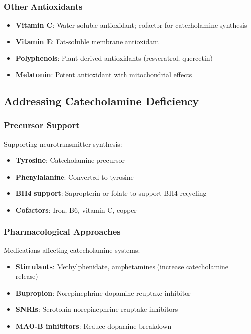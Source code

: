 \subsubsection{Other Antioxidants}

\begin{itemize}
    \item \textbf{Vitamin C}: Water-soluble antioxidant; cofactor for catecholamine synthesis
    \item \textbf{Vitamin E}: Fat-soluble membrane antioxidant
    \item \textbf{Polyphenols}: Plant-derived antioxidants (resveratrol, quercetin)
    \item \textbf{Melatonin}: Potent antioxidant with mitochondrial effects
\end{itemize}

\subsection{Addressing Catecholamine Deficiency}

\subsubsection{Precursor Support}

Supporting neurotransmitter synthesis:

\begin{itemize}
    \item \textbf{Tyrosine}: Catecholamine precursor
    \item \textbf{Phenylalanine}: Converted to tyrosine
    \item \textbf{BH4 support}: Sapropterin or folate to support BH4 recycling
    \item \textbf{Cofactors}: Iron, B6, vitamin C, copper
\end{itemize}

\subsubsection{Pharmacological Approaches}

Medications affecting catecholamine systems:

\begin{itemize}
    \item \textbf{Stimulants}: Methylphenidate, amphetamines (increase catecholamine release)
    \item \textbf{Bupropion}: Norepinephrine-dopamine reuptake inhibitor
    \item \textbf{SNRIs}: Serotonin-norepinephrine reuptake inhibitors
    \item \textbf{MAO-B inhibitors}: Reduce dopamine breakdown
\end{itemize}

